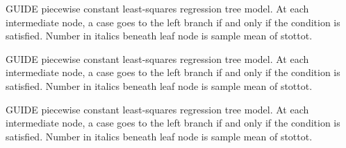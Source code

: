 \documentclass[12pt]{article}
\begin{document}
 \begin{center}
 \end{center}
GUIDE piecewise constant least-squares regression tree model.
At each intermediate node, a case goes to the left branch 
  if and only if the condition is satisfied.
Number in italics beneath leaf node is sample mean of stottot.
 \begin{center}
 \end{center}
GUIDE piecewise constant least-squares regression tree model.
At each intermediate node, a case goes to the left branch 
  if and only if the condition is satisfied.
Number in italics beneath leaf node is sample mean of stottot.
 \begin{center}
 \end{center}
GUIDE piecewise constant least-squares regression tree model.
At each intermediate node, a case goes to the left branch 
  if and only if the condition is satisfied.
Number in italics beneath leaf node is sample mean of stottot.
\end{document}
